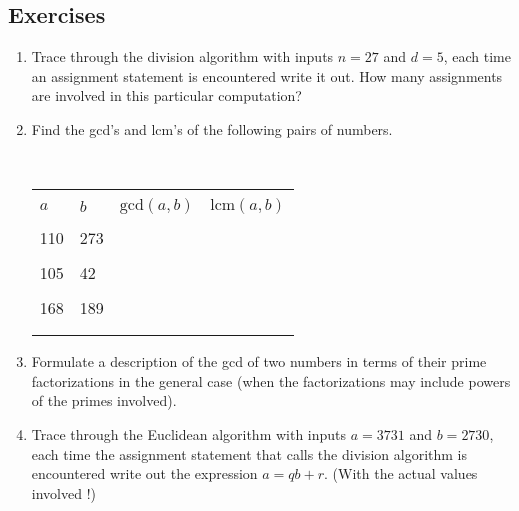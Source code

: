 \documentclass[10pt,]{book}
\theoremstyle{plain}
\theoremstyle{definition}
\theoremstyle{definition}
\numberwithin{equation}{section}
\newcommand{\hrulethin}  {\noalign{\hrule height 0.04em}}
\newcommand{\hint}[1]{ }
\newcommand{\lcm}[2]{\mbox{lcm} (#1, #2)}
\renewcommand{\gcd}[2]{\mbox{gcd} (#1, #2)}
\newcommand{\lt}{ < }
\begin{document}
\subsection[{Exercises}]{Exercises}\label{exercises-5}
\leavevmode%
\begin{enumerate}[label=(\alph*)]
\item\hypertarget{li-91}{}
          Trace through the division algorithm with inputs \(n=27\) and
            \(d=5\), each time an assignment statement is encountered write it
            out.  How many assignments are involved in this particular
            computation?
          \hint{

          r=27 
          q=0  
          r=27-5=22  
          q=0+1=1  
          r=22-5=17  
          q=1+1=2  
          r=17-5=12  
          q=2+1=3  
          r=12-5=7  
          q=3+1=4  
          r=7-5=2  
          q=4+1=5  
          return r is 2 and q is 5.
          }
\item\hypertarget{li-92}{}
          Find the gcd's and lcm's of the following pairs of numbers.


          \
          \begin{tabular}{llll}
&&&\tabularnewline\hrulethin
\(a\)&\(b\)&\(\gcd{a}{b}\)&\(\lcm{a}{b}\)\tabularnewline[0pt]
&&&\tabularnewline\hrulethin
110&273&&\tabularnewline[0pt]
&&&\tabularnewline\hrulethin
105&42&&\tabularnewline[0pt]
&&&\tabularnewline\hrulethin
168&189&&\tabularnewline[0pt]
&&&\tabularnewline\hrulethin
\end{tabular}

          \hint{For such small numbers you can just find their prime factorizations and use that, although it might be useful to practice your understanding of the Euclidean algorithm by tracing through it to find the gcd's and then using the formula
          \begin{equation*}
            \lcm (a,b) = \frac{ab}{\gcd (a,b).}
          \end{equation*}
          }
\item\hypertarget{li-93}{}
          Formulate a description of the gcd of two numbers in terms of
            their prime factorizations in the general case (when the
            factorizations may include powers of the primes involved).



          \hint{Suppose that one number's prime factorization contains \(p^e\) and the other
          contains \(p^f\), where \(e \lt  f\). What power of \(p\) will divide both, \(p^e\) or \(p^f\) ?}
\item\hypertarget{li-94}{}
          Trace through the Euclidean algorithm with inputs \(a=3731\) and
            \(b=2730\), each time the assignment statement that calls the division
            algorithm is encountered write out the expression \(a=qb+r\).   (With the
            actual values involved !) 



          \hint{The quotients you obtain should alternate between 1 and 2.}
\end{enumerate}
\typeout{************************************************}
\typeout{************************************************}
\end{document}
